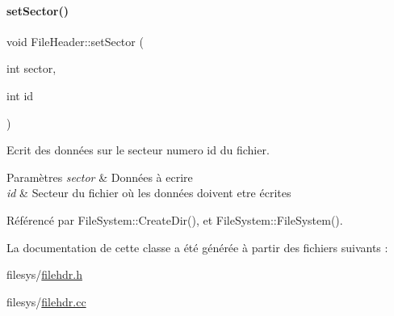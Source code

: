 \hypertarget{class_file_header_a97a47f8bf9c3200f64b799815b9b9bbd}{}\label{class_file_header_a97a47f8bf9c3200f64b799815b9b9bbd} 
\paragraph{\texorpdfstring{set\+Sector()}{setSector()}}
{\footnotesize\ttfamily void File\+Header\+::set\+Sector (\begin{DoxyParamCaption}\item[{int}]{sector,  }\item[{int}]{id }\end{DoxyParamCaption})}



Ecrit des données sur le secteur numero id du fichier. 


\begin{DoxyParams}{Paramètres}
{\em sector} & Données à ecrire \\
\hline
{\em id} & Secteur du fichier où les données doivent etre écrites \\
\hline
\end{DoxyParams}


Référencé par File\+System\+::\+Create\+Dir(), et File\+System\+::\+File\+System().



La documentation de cette classe a été générée à partir des fichiers suivants \+:\begin{DoxyCompactItemize}
\item 
filesys/\hyperlink{filehdr_8h}{filehdr.\+h}\item 
filesys/\hyperlink{filehdr_8cc}{filehdr.\+cc}\end{DoxyCompactItemize}
